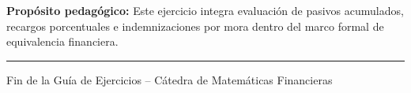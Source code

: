 \documentclass[11pt, a4paper]{article}
\begin{document}
\textbf{Propósito pedagógico:} Este ejercicio integra evaluación de pasivos acumulados, recargos porcentuales e indemnizaciones por mora dentro del marco formal de equivalencia financiera.

\vspace{0.4cm}
\hrule
\vspace{0.2cm}
\begin{center}
\small \color{darkgray} Fin de la Guía de Ejercicios -- Cátedra de Matemáticas Financieras
\end{center}
\end{document}
